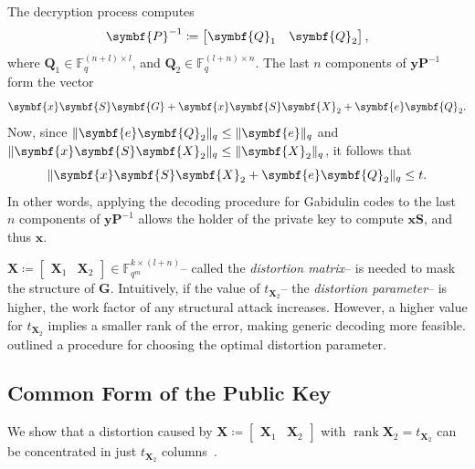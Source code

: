 \documentclass[version=last, paper=A4, parskip=half, oneside,%
toc=bibliography, toc=listof, listof=leveldown]{scrbook}
\theoremstyle{plain}
\theoremstyle{definition}
\theoremstyle{remark}
\renewcommand*{\vec}{\symbf}
\newcommand*{\mat}{\symbf}
\DeclareMathOperator{\rank}{rank}
\newcommand*{\FF}{\ensuremath{\mathbb{F}}}
\DeclarePairedDelimiter{\norm}{\lVert}{\rVert}
\newcommand*{\normR}[2]{\ensuremath{\norm{#1}_{#2}}}
\begin{document}
The decryption process computes
\[
  \mat{P}^{-1} \coloneqq
  \begin{bmatrix} \mat{Q}_1 & \mat{Q}_2 \end{bmatrix}\text,
\]
where \(\mat{Q}_1 \in \FF_q^{(n + l) \times l}\), and
\(\mat{Q}_2 \in \FF_q^{(l + n) \times n}\).  The last \(n\) components of
\(\vec{y} \mat{P}^{-1}\) form the vector
\[
  \vec{x} \mat{S} \mat{G} + \vec{x} \mat{S} \mat{X}_2 + \vec{e} \mat{Q}_2\text.
\]
Now, since \(\normR{\vec{e} \mat{Q}_2}{q} \le \normR{\vec{e}}{q}\) and
\(\normR{\vec{x} \mat{S} \mat{X}_2}{q} \le \normR{\mat{X}_2}{q}\), it follows
that
\[
  \normR{\vec{x} \mat{S} \mat{X}_2 + \vec{e} \mat{Q}_2}{q} \le t\text.
\]
In other words, applying the decoding procedure for Gabidulin codes to the last
\(n\) components of \(\vec{y} \mat{P}^{-1}\) allows the holder of the private
key to compute \(\vec{x} \mat{S}\), and thus \(\vec{x}\).

\(\mat{X} \coloneqq \begin{bmatrix} \mat{X}_1 & \mat{X}_2 \end{bmatrix} \in \FF_{q^m}^{k \times (l + n)}\)\---
called the \emph{distortion matrix}\--- is needed to mask the structure of
\(\mat{G}\).  Intuitively, if the value of \(t_{\mat{X}_2}\)\--- the
\emph{distortion parameter}\--- is higher, the work factor of any structural
attack increases.  However, a higher value for \(t_{\mat{X}_2}\) implies a
smaller rank of the error, making generic decoding more feasible.
\Textcite{GY05} outlined a procedure for choosing the optimal distortion
parameter.

\subsection{Common Form of the Public Key}

We show that a distortion caused by
\(\mat{X} \coloneqq \begin{bmatrix} \mat{X}_1 & \mat{X}_2 \end{bmatrix}\) with
\(\rank \mat{X}_2 = t_{\mat{X}_2}\) can be concentrated in just
\(t_{\mat{X}_2}\) columns~\cite{Ksh07}.
\end{document}
